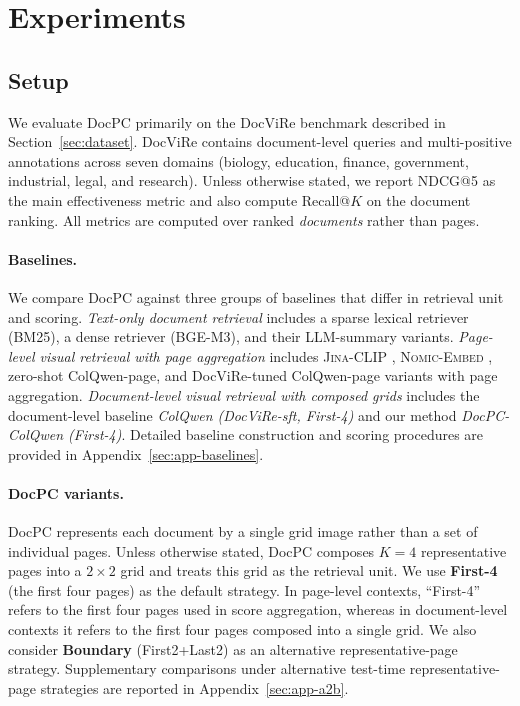 \section{Experiments}
\label{sec:experiments}

\subsection{Setup}

We evaluate DocPC primarily on the DocViRe benchmark described in Section~\ref{sec:dataset}. DocViRe contains document-level queries and multi-positive annotations across seven domains (biology, education, finance, government, industrial, legal, and research). Unless otherwise stated, we report NDCG@5 as the main effectiveness metric and also compute Recall@$K$ on the document ranking. All metrics are computed over ranked \emph{documents} rather than pages.

\paragraph{Baselines.}
We compare DocPC against three groups of baselines that differ in retrieval unit and scoring. \emph{Text-only document retrieval} includes a sparse lexical retriever (\textsc{BM25}), a dense retriever (\textsc{BGE-M3}), and their LLM-summary variants. \emph{Page-level visual retrieval with page aggregation} includes \textsc{Jina-CLIP} \citep{koukounas2024jinaclip}, \textsc{Nomic-Embed} \citep{nussbaum2024nomicembed}, zero-shot ColQwen-page, and DocViRe-tuned ColQwen-page variants with page aggregation. \emph{Document-level visual retrieval with composed grids} includes the document-level baseline \emph{ColQwen (DocViRe-sft, First-4)} and our method \emph{DocPC-ColQwen (First-4)}. Detailed baseline construction and scoring procedures are provided in Appendix~\ref{sec:app-baselines}.

\paragraph{DocPC variants.}
DocPC represents each document by a single grid image rather than a set of individual pages. Unless otherwise stated, DocPC composes $K=4$ representative pages into a $2{\times}2$ grid and treats this grid as the retrieval unit. We use \textbf{First-4} (the first four pages) as the default strategy. In page-level contexts, ``First-4'' refers to the first four pages used in score aggregation, whereas in document-level contexts it refers to the first four pages composed into a single grid. We also consider \textbf{Boundary} (First2+Last2) as an alternative representative-page strategy. Supplementary comparisons under alternative test-time representative-page strategies are reported in Appendix~\ref{sec:app-a2b}.

